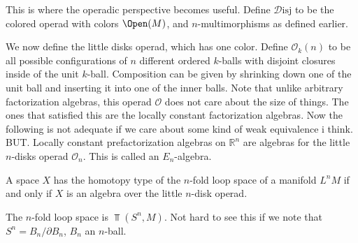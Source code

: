 This is where the operadic perspective becomes useful. Define $\mathcal{D} \mathrm{isj} $ to be the colored operad with colors $\Open(M) $, and $n$-multimorphisms as defined earlier.

We now define the little disks operad, which has one color. Define $\mathcal{O}_k(n)$ to be all possible configurations of $n$ different ordered $k$-balls with disjoint closures inside of the unit $k$-ball. Composition can be given by shrinking down one of the unit ball and inserting it into one of the inner balls. Note that unlike arbitrary factorization algebras, this operad $\mathcal{O} $ does not care about the size of things. The ones that satisfied this are the locally constant factorization algebras. Now the following is not adequate if we care about some kind of weak equivalence i think. BUT. Locally constant prefactorization algebras on $\mathbb{R} ^n$ are algebras for the little $n$-disks operad $\mathcal{O}_n$. This is called an $E_n$-algebra.

\begin{theorem}\label{thm:7.1.10}
	A space $X$ has the homotopy type of the $n$-fold loop space of a manifold $L^nM$ if and only if $X$ is an algebra over the little $n$-disk operad.
\end{theorem}
The $n$-fold loop space is $\Top (S^n,M)$. Not hard to see this if we note that $S^n = B_n / \partial B_n$, $B_n$ an $n$-ball.
